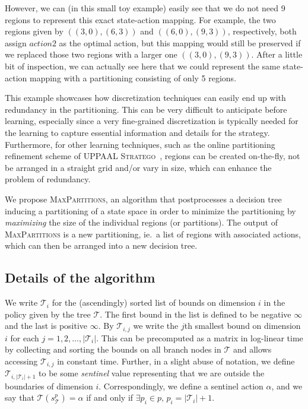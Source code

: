 However, we can (in this small toy example) easily see that we do not need 9
regions to represent this exact state-action mapping. For example, the two
regions given by $((3,0),(6,3))$ and $((6,0),(9,3))$, respectively, both assign
$action2$ as the optimal action, but this mapping would still be preserved if we
replaced those two regions with a larger one $((3,0),(9,3))$. After a little bit
of inspection, we can actually see here that we could represent the same
state-action mapping with a partitioning consisting of only 5 regions.

This example showcases how discretization techniques can easily end up with
redundancy in the partitioning. This can be very difficult to anticipate before
learning, especially since a very fine-grained discretization is typically
needed for the learning to capture essential information and details for the
strategy. Furthermore, for other learning techniques, such as the online
partitioning refinement scheme of \textsc{UPPAAL Stratego}~\cite{Manfred2019},
regions can be created on-the-fly, not be arranged in a straight grid and/or
vary in size, which can enhance the problem of redundancy.

We propose \textsc{MaxPartitions}, an algorithm that postprocesses a decision
tree inducing a partitioning of a state space in order to minimize the
partitioning by \textit{maximizing} the size of the individual regions (or
partitions). The output of \textsc{MaxPartitions} is a new partitioning, ie.\ a
list of regions with associated actions, which can then be arranged into a new
decision tree.


\subsection{Details of the algorithm}%
\label{sub:maxPartsDescription}

We write $\mathcal{T}_i$ for the (ascendingly) sorted list of bounds on
dimension $i$ in the policy given by the tree $\mathcal{T}$. The first bound in
the list is defined to be negative $\infty$ and the last is positive $\infty$.
By $\mathcal{T}_{i,j}$ we write the $j$th smallest bound on dimension $i$ for
each $j = 1, 2, \ldots, |\mathcal{T}_i|$. This can be precomputed as a matrix in
log-linear time by collecting and sorting the bounds on all branch nodes in
$\mathcal{T}$ and allows accessing $\mathcal{T}_{i,j}$ in constant time.
Further, in a slight abuse of notation, we define $\mathcal{T}_{i,
|\mathcal{T}_i| + 1}$ to be some \textit{sentinel} value representing that we
are outside the boundaries of dimension $i$. Correspondingly, we define a
sentinel action $\alpha$, and we say that $\mathcal{T}(s^p_{\mathcal{T}}) =
\alpha$ if and only if $\exists p_i \in p,\, p_i = |\mathcal{T}_i| + 1$.

